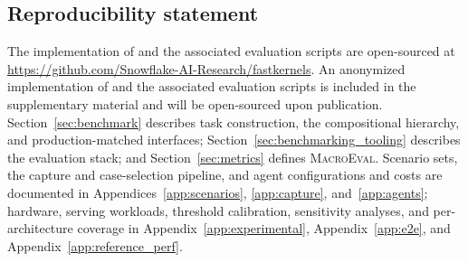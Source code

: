 \subsection*{Reproducibility statement}

\ificlrfinal
The implementation of \fastkernels{} and the associated evaluation scripts are open-sourced at \url{https://github.com/Snowflake-AI-Research/fastkernels}.
\else
An anonymized implementation of \fastkernels{} and the associated evaluation scripts is included in the supplementary material and will be open-sourced upon publication.
\fi
Section~\ref{sec:benchmark} describes task construction, the compositional hierarchy, and production-matched interfaces;
Section~\ref{sec:benchmarking_tooling} describes the evaluation stack;
and Section~\ref{sec:metrics} defines \textsc{MacroEval}.
Scenario sets, the capture and case-selection pipeline, and agent configurations and costs are documented in Appendices~\ref{app:scenarios}, \ref{app:capture}, and~\ref{app:agents}; hardware, serving workloads, threshold calibration, sensitivity analyses, and per-architecture coverage in Appendix~\ref{app:experimental}, Appendix~\ref{app:e2e}, and Appendix~\ref{app:reference_perf}.
